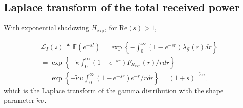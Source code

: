 \documentclass[lettersize,journal]{IEEEtran}
\begin{document}
\subsection{Laplace transform of the total received power}

With exponential shadowing ${H}_{\text{exp}}$, for Re$(s)>1$,

\begin{align}
  \label{eq:lapdef}
  &\mathcal{L}_{I}(s)\triangleq \mathbb{E}\left(e^{-sI}\right)= \exp\left\{-\int_0^{\infty}(1-e^{-sr}) \lambda_{\mathcal{G}}(r) dr \right\} \nonumber \\
  &=\exp\left\{-\tilde{\kappa}\int_0^{\infty}(1-e^{-sr}) F_{{H}_{\text{exp}}}(r) /r dr \right\} \nonumber \\
  &=\exp\left\{-\tilde{\kappa}\upsilon_{}\int_0^{\infty}(1-e^{-sr}) e^{-r} /r dr \right\} =(1+s)^{-\tilde{\kappa}\upsilon_{}},
\end{align}
which is the Laplace transform of the gamma distribution with the shape parameter $\tilde{\kappa}\upsilon_{}$. 



\end{document}
